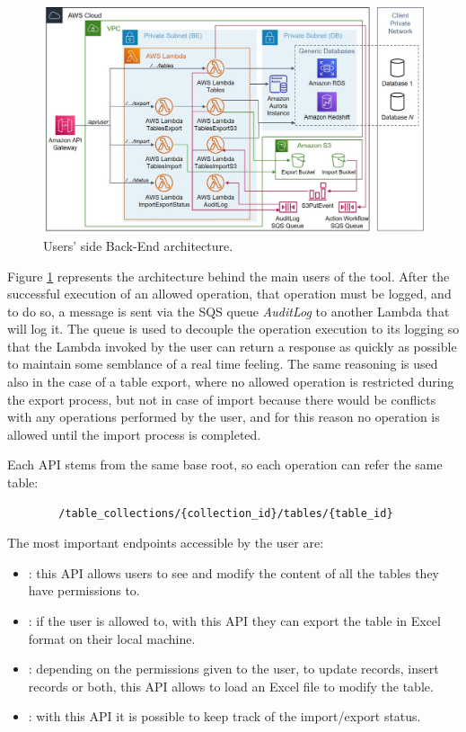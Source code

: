 \begin{figure}[!htb]
    \centering
    \includegraphics[width=15.8cm]{chapters/images/ch_3/BE_User.jpg}
    \caption{Users' side Back-End architecture.}
    \label{fig:BE_User}
\end{figure}

Figure \ref{fig:BE_User} represents the architecture behind the main users of the tool. After the successful execution of an allowed operation, that operation must be logged, and to do so, a message is sent via the SQS queue \emph{AuditLog} to another Lambda that will log it. The queue is used to decouple the operation execution to its logging so that the Lambda invoked by the user can return a response as quickly as possible to maintain some semblance of a real time feeling. The same reasoning is used also in the case of a table export, where no allowed operation is restricted during the export process, but not in case of import because there would be conflicts with any operations performed by the user, and for this reason no operation is allowed until the import process is completed.

Each API stems from the same base root, so each operation can refer the same table:
\begin{center}
    \begin{lstlisting}
        /table_collections/{collection_id}/tables/{table_id}
    \end{lstlisting}
\end{center}


The most important endpoints accessible by the user are:
\begin{itemize}
    \item {}: this API allows users to see and modify the content of all the tables they have permissions to. 
    \item {}: if the user is allowed to, with this API they can export the table in Excel format on their local machine. 
    \item {}: depending on the permissions given to the user, to update records, insert records or both, this API allows to load an Excel file to modify the table.
    \item {}: with this API it is possible to keep track of the import/export status.
\end{itemize}

